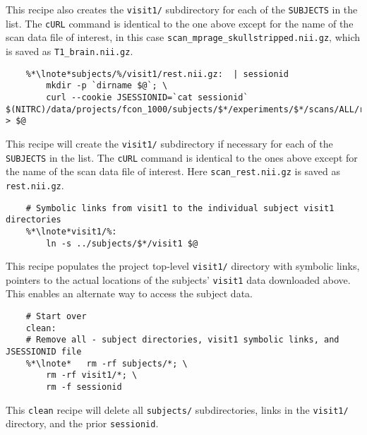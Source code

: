 \indent {} This recipe also creates the \texttt{visit1/} subdirectory for each of the \texttt{SUBJECTS} in the list. The \texttt{cURL} command is identical to the one above except for the name of the scan data file of interest, in this case \texttt{scan_mprage_skullstripped.nii.gz}, which is saved as \texttt{T1_brain.nii.gz}.

\begin{lstlisting}
	%*\lnote*subjects/%/visit1/rest.nii.gz:  | sessionid
		mkdir -p `dirname $@`; \
		curl --cookie JSESSIONID=`cat sessionid` $(NITRC)/data/projects/fcon_1000/subjects/$*/experiments/$*/scans/ALL/resources/NIfTI/files/scan_rest.nii.gz > $@
\end{lstlisting}

\indent {} This recipe will create the \texttt{visit1/} subdirectory if necessary for each of the \texttt{SUBJECTS} in the list. The \texttt{cURL} command is identical to the ones above except for the name of the scan data file of interest. Here \texttt{scan_rest.nii.gz} is saved as \texttt{rest.nii.gz}.


\begin{lstlisting}
	# Symbolic links from visit1 to the individual subject visit1 directories
	%*\lnote*visit1/%:
		ln -s ../subjects/$*/visit1 $@
\end{lstlisting}

\indent {} This recipe populates the project top-level \texttt{visit1/} directory with symbolic links, pointers to the actual locations of the subjects' \texttt{visit1} data downloaded above. This enables an alternate way to access the subject data.

\begin{lstlisting}
	# Start over
	clean:
	# Remove all - subject directories, visit1 symbolic links, and JSESSIONID file
	%*\lnote*	rm -rf subjects/*; \
		rm -rf visit1/*; \
		rm -f sessionid
\end{lstlisting}

 This \texttt{clean} recipe will delete all \texttt{subjects/} subdirectories, links in the \texttt{visit1/} directory, and the prior \texttt{sessionid}.

